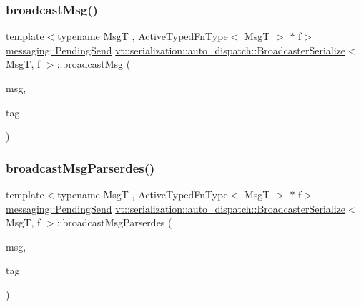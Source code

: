 \subsubsection{\texorpdfstring{broadcast\+Msg()}{broadcastMsg()}}
{\footnotesize\ttfamily template$<$typename MsgT , Active\+Typed\+Fn\+Type$<$ Msg\+T $>$ $\ast$ f$>$ \\
\hyperlink{structvt_1_1messaging_1_1_pending_send}{messaging\+::\+Pending\+Send} \hyperlink{structvt_1_1serialization_1_1auto__dispatch_1_1_broadcaster_serialize}{vt\+::serialization\+::auto\+\_\+dispatch\+::\+Broadcaster\+Serialize}$<$ MsgT, f $>$\+::broadcast\+Msg (\begin{DoxyParamCaption}\item[{MsgT $\ast$}]{msg,  }\item[{\hyperlink{namespacevt_a84ab281dae04a52a4b243d6bf62d0e52}{Tag\+Type} const \&}]{tag }\end{DoxyParamCaption})\hspace{0.3cm}{\ttfamily [static]}}

\mbox{\label{structvt_1_1serialization_1_1auto__dispatch_1_1_broadcaster_serialize_af56cd581c257a02f6344de28bc5aa893}} 
\subsubsection{\texorpdfstring{broadcast\+Msg\+Parserdes()}{broadcastMsgParserdes()}}
{\footnotesize\ttfamily template$<$typename MsgT , Active\+Typed\+Fn\+Type$<$ Msg\+T $>$ $\ast$ f$>$ \\
\hyperlink{structvt_1_1messaging_1_1_pending_send}{messaging\+::\+Pending\+Send} \hyperlink{structvt_1_1serialization_1_1auto__dispatch_1_1_broadcaster_serialize}{vt\+::serialization\+::auto\+\_\+dispatch\+::\+Broadcaster\+Serialize}$<$ MsgT, f $>$\+::broadcast\+Msg\+Parserdes (\begin{DoxyParamCaption}\item[{MsgT $\ast$}]{msg,  }\item[{\hyperlink{namespacevt_a84ab281dae04a52a4b243d6bf62d0e52}{Tag\+Type} const \&}]{tag }\end{DoxyParamCaption})\hspace{0.3cm}{\ttfamily [static]}}



